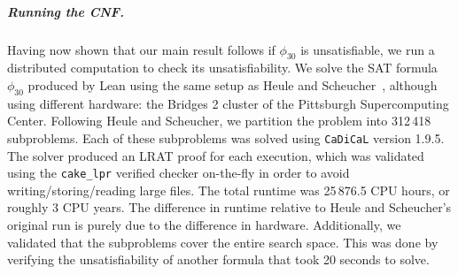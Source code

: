 \subparagraph*{Running the CNF.}
Having now shown that our main result follows if $\phi_{30}$ is unsatisfiable,
we run a distributed computation to check its unsatisfiability.
We solve the SAT formula~$\phi_{30}$ produced by Lean using the same setup as
Heule and Scheucher~\cite{emptyHexagonNumber}, although using different hardware:
the Bridges 2 cluster of the Pittsburgh Supercomputing Center.
Following Heule and Scheucher,
we partition the problem into 312\,418 subproblems.
Each of these subproblems was
solved using {\tt CaDiCaL} version 1.9.5.
The solver produced an LRAT proof for each execution,
which was validated using the {\tt cake\_lpr} verified checker on-the-fly
in order to avoid writing/storing/reading large files.
The total runtime was 25\,876.5 CPU hours, or roughly 3 CPU years.
The difference in runtime relative to Heule and Scheucher's original run
is purely due to the difference in hardware.
Additionally,
we validated that the subproblems cover the entire search space.
This was done by verifying the unsatisfiability
of another formula that took 20 seconds to solve.


